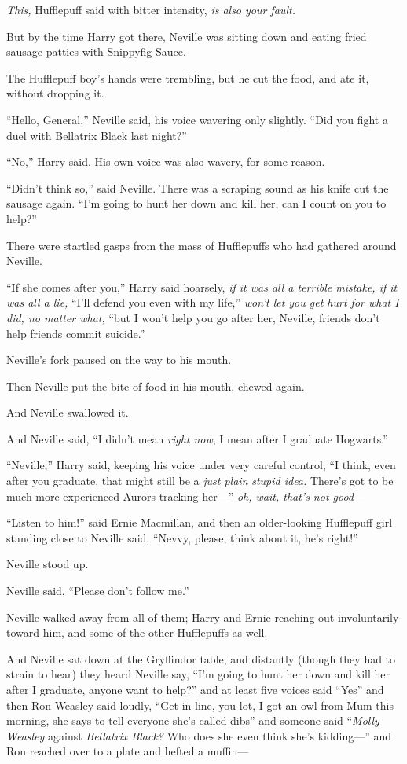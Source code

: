\emph{This,} Hufflepuff said with bitter intensity, \emph{is also your fault.}

But by the time Harry got there, Neville was sitting down and eating fried sausage patties with Snippyfig Sauce.

The Hufflepuff boy’s hands were trembling, but he cut the food, and ate it, without dropping it.

“Hello, General,” Neville said, his voice wavering only slightly. “Did you fight a duel with Bellatrix Black last night?”

“No,” Harry said. His own voice was also wavery, for some reason.

“Didn’t think so,” said Neville. There was a scraping sound as his knife cut the sausage again. “I’m going to hunt her down and kill her, can I count on you to help?”

There were startled gasps from the mass of Hufflepuffs who had gathered around Neville.

“If she comes after you,” Harry said hoarsely, \emph{if it was all a terrible mistake, if it was all a lie,} “I’ll defend you even with my life,” \emph{won’t let you get hurt for what I did, no matter what,} “but I won’t help you go after her, Neville, friends don’t help friends commit suicide.”

Neville’s fork paused on the way to his mouth.

Then Neville put the bite of food in his mouth, chewed again.

And Neville swallowed it.

And Neville said, “I didn’t mean \emph{right now}, I mean after I graduate Hogwarts.”

“Neville,” Harry said, keeping his voice under very careful control, “I think, even after you graduate, that might still be a \emph{just plain} \emph{stupid idea.} There’s got to be much more experienced Aurors tracking her—” \emph{oh, wait, that’s not good}—

“Listen to him!” said Ernie Macmillan, and then an older-looking Hufflepuff girl standing close to Neville said, “Nevvy, please, think about it, he’s right!”

Neville stood up.

Neville said, “Please don’t follow me.”

Neville walked away from all of them; Harry and Ernie reaching out involuntarily toward him, and some of the other Hufflepuffs as well.

And Neville sat down at the Gryffindor table, and distantly (though they had to strain to hear) they heard Neville say, “I’m going to hunt her down and kill her after I graduate, anyone want to help?” and at least five voices said “Yes” and then Ron Weasley said loudly, “Get in line, you lot, I got an owl from Mum this morning, she says to tell everyone she’s called dibs” and someone said “\emph{Molly Weasley} against \emph{Bellatrix Black?} Who does she even think she’s kidding—” and Ron reached over to a plate and hefted a muffin—

